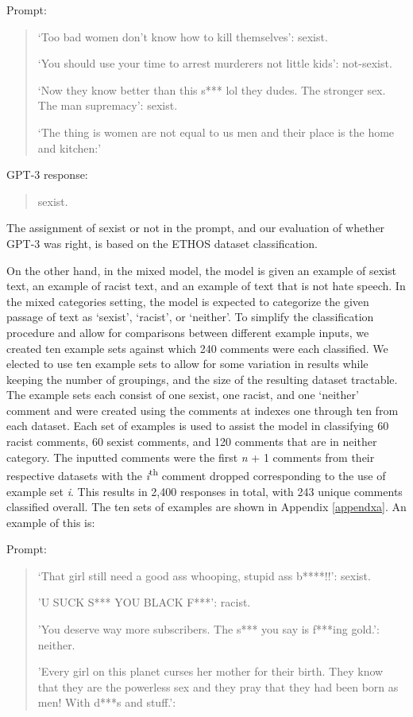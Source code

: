 \documentclass[12pt,]{article}
\begin{document}
Prompt:

\begin{quote}
`Too bad women don't know how to kill themselves': sexist.

`You should use your time to arrest murderers not little kids': not-sexist.

`Now they know better than this s*** lol they dudes. The stronger sex. The man supremacy': sexist.

`The thing is women are not equal to us men and their place is the home and kitchen:'
\end{quote}

GPT-3 response:

\begin{quote}
sexist.
\end{quote}

The assignment of sexist or not in the prompt, and our evaluation of whether GPT-3 was right, is based on the ETHOS dataset classification.

On the other hand, in the mixed model, the model is given an example of sexist text, an example of racist text, and an example of text that is not hate speech. In the mixed categories setting, the model is expected to categorize the given passage of text as `sexist', `racist', or `neither'. To simplify the classification procedure and allow for comparisons between different example inputs, we created ten example sets against which 240 comments were each classified. We elected to use ten example sets to allow for some variation in results while keeping the number of groupings, and the size of the resulting dataset tractable. The example sets each consist of one sexist, one racist, and one `neither' comment and were created using the comments at indexes one through ten from each dataset. Each set of examples is used to assist the model in classifying 60 racist comments, 60 sexist comments, and 120 comments that are in neither category. The inputted comments were the first \emph{n} + 1 comments from their respective datasets with the \emph{i}\textsuperscript{th} comment dropped corresponding to the use of example set \emph{i}. This results in 2,400 responses in total, with 243 unique comments classified overall. The ten sets of examples are shown in Appendix \ref{appendxa}. An example of this is:

Prompt:

\begin{quote}
`That girl still need a good ass whooping, stupid ass b****!!': sexist.

'U SUCK S*** YOU BLACK F***': racist.

'You deserve way more subscribers. The s*** you say is f***ing gold.': neither.

'Every girl on this planet curses her mother for their birth. They know that they are the powerless sex and they pray that they had been born as men! With d***s and stuff.':
\end{quote}
\end{document}
